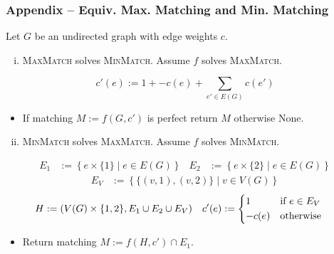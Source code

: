 \documentclass{beamer} %
\begin{document}
\begin{frame}
  \frametitle{Appendix -- Equiv. Max. Matching and Min. Matching}

  Let $G$ be an undirected graph with edge weights $c$.
  \vspace*{0.25cm}
  \begin{enumerate}[(i)]
    \item \textsc{MaxMatch}\footnotemark[1]{} solves \textsc{MinMatch}\footnotemark[2]{}. Assume $f$ solves \textsc{MaxMatch}.
  \end{enumerate}
  \begin{equation*}
    c'(e) := 1 + - c(e) + \sum_{e'\in E(G)} c(e')
  \end{equation*}
  \vspace*{-0.4cm}
  \begin{itemize}
    \item If matching $M:=f(G,c')$ is perfect return $M$ otherwise None.
  \end{itemize}
  \vspace*{0.5cm}
  \begin{enumerate}[(i)]
    \setcounter{enumi}{1}
    \item \textsc{MinMatch} solves \textsc{MaxMatch}. Assume $f$ solves \textsc{MinMatch}.
  \end{enumerate}
  \vspace*{-0.25cm}
  \begin{align*}
    E_1 & := \left\{e\times\{1\}\mid e\in E(G)\right\} & E_2 & := \left\{e\times\{2\}\mid e\in E(G)\right\}
  \end{align*}
  \vspace*{-1cm}
  \begin{align*}
    E_V & := \left\{\{(v,1),(v,2)\}\mid v\in V(G)\right\}
  \end{align*}
  \vspace*{-1cm}
  \begin{align*}
    H & := \left(V(G)\times\{1,2\},E_1\cup E_2\cup E_V\right) & c'(e) & := \begin{cases*} 1 & if $e\in E_V$ \\ -c(e) & otherwise\end{cases*}
  \end{align*}
  \vspace*{-0.4cm}
  \begin{itemize}
    \item Return matching $M:=f(H,c')\cap E_1$.
  \end{itemize}

\end{frame}
\end{document}
